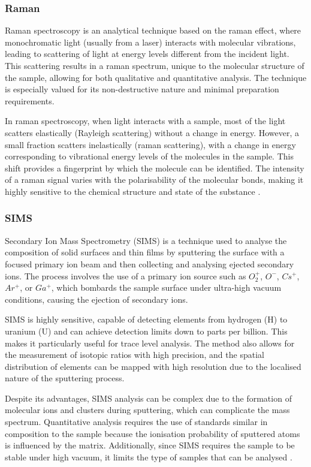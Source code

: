 \begin{refsection}
\subsubsection{Raman}
\label{subsubsec:raman}
Raman spectroscopy is an analytical technique based on the raman effect, where monochromatic light (usually from a laser) interacts with molecular vibrations, leading to scattering of light at energy levels different from the incident light. This scattering results in a raman spectrum, unique to the molecular structure of the sample, allowing for both qualitative and quantitative analysis. The technique is especially valued for its non-destructive nature and minimal preparation requirements.

In raman spectroscopy, when light interacts with a sample, most of the light scatters elastically (Rayleigh scattering) without a change in energy. However, a small fraction scatters inelastically (raman scattering), with a change in energy corresponding to vibrational energy levels of the molecules in the sample. This shift provides a fingerprint by which the molecule can be identified. The intensity of a raman signal varies with the polarisability of the molecular bonds, making it highly sensitive to the chemical structure and state of the substance \cite{Bumbrah2016}.

\subsubsection{SIMS}
Secondary Ion Mass Spectrometry (SIMS) is a technique used to analyse the composition of solid surfaces and thin films by sputtering the surface with a focused primary ion beam and then collecting and analysing ejected secondary ions. The process involves the use of a primary ion source such as \(O_2^+\), \(O^-\), \(Cs^+\), \(Ar^+\), or \(Ga^+\), which bombards the sample surface under ultra-high vacuum conditions, causing the ejection of secondary ions.

SIMS is highly sensitive, capable of detecting elements from hydrogen (H) to uranium (U) and can achieve detection limits down to parts per billion. This makes it particularly useful for trace level analysis. The method also allows for the measurement of isotopic ratios with high precision, and the spatial distribution of elements can be mapped with high resolution due to the localised nature of the sputtering process.

Despite its advantages, SIMS analysis can be complex due to the formation of molecular ions and clusters during sputtering, which can complicate the mass spectrum. Quantitative analysis requires the use of standards similar in composition to the sample because the ionisation probability of sputtered atoms is influenced by the matrix. Additionally, since SIMS requires the sample to be stable under high vacuum, it limits the type of samples that can be analysed \cite{Fearn2015}.


\end{refsection}
